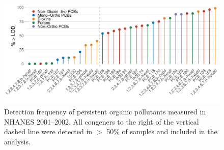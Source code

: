 \begin{landscape}
\begin{figure}
    \centering
\includegraphics[scale=0.55]{figures/pop_detect.pdf}
   \caption[Detection frequency of POPs in NHANES 2001--2002]{Detection frequency of persistent organic pollutants measured in NHANES 2001--2002. All congeners to the right of the vertical dashed line were detected in $>$ 50\% of samples and included in the analysis.}
    \label{fig:detect}
\end{figure}
\end{landscape}

